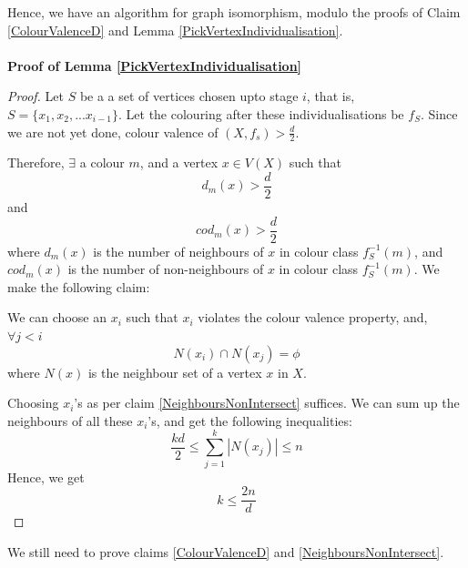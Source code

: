 Hence, we have an algorithm for graph isomorphism, modulo the proofs of Claim \ref{ColourValenceD} and Lemma \ref{PickVertexIndividualisation}.
\paragraph*{}
\textbf{Proof of Lemma \ref{PickVertexIndividualisation}}
\begin{proof}
Let $S$ be a a set of vertices chosen upto stage $i$, that is, $S = \lbrace x_1, x_2, ... x_{i-1} \rbrace$. Let the colouring after these individualisations be $f_S$.
Since we are not yet done, colour valence of $(X, f_s) > \frac{d}{2}$.

Therefore, $\exists$ a colour $m$, and a vertex $x \in V(X)$ such that
\[
d_m (x) > \frac{d}{2}
\]
and 
\[
cod_m (x) > \frac{d}{2}
\]
where $d_m(x)$ is the number of neighbours of $x$ in colour class $f_S^{-1}(m)$, and $cod_m(x)$ is the number of non-neighbours of $x$ in colour class $f_S^{-1}(m)$.
We make the following claim:
\begin{claim}\label{NeighboursNonIntersect}
We can choose an $x_i$ such that $x_i$ violates the colour valence property, and,  
$\forall j < i$
\[
N(x_i) \cap N(x_j) = \phi 
\]
where $N(x)$ is the neighbour set of a vertex $x$ in $X$.
\end{claim}
Choosing $x_i$'s as per claim \ref{NeighboursNonIntersect} suffices. We can sum up the neighbours of all these $x_i$'s, and get the following inequalities:
\[
\frac{kd}{2} \le \sum_{j=1}^k |N(x_j)| \le n
\] 
Hence, we get 
\[
k \le \frac{2n}{d}
\]
\end{proof}

We still need to prove claims \ref{ColourValenceD} and \ref{NeighboursNonIntersect}.

